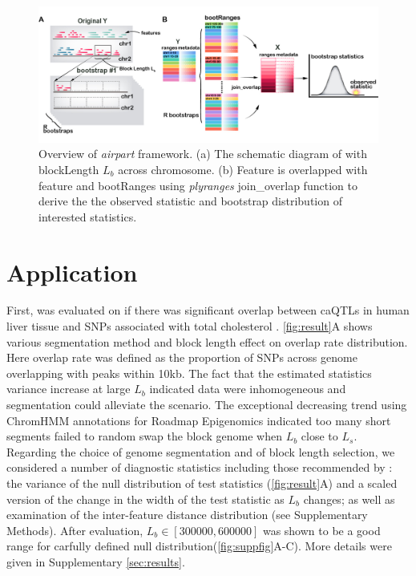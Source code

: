 \vspace{-0.3cm}
\begin{figure}[htbp]
\centering%
\setlength{\abovecaptionskip}{-0.05cm}
\includegraphics[scale=0.65]{Figures/bootRanges.jpg}
\caption{Overview of \textit{airpart} framework. (a) The schematic diagram of \bootranges with blockLength $L_b$ across chromosome. 
(b) 
Feature  is overlapped with feature  and bootRanges using \emph{plyranges} join\_overlap function
to derive 
the the observed statistic and bootstrap distribution of interested statistics.}
\label{fig:framework}
\vspace{-0.5cm}
\end{figure}

\vspace*{-20pt}
\section{Application}
First, \bootranges was evaluated on if there was significant overlap between caQTLs in human liver tissue and SNPs associated with total cholesterol \citep{CURRIN20211169}.
\cref{fig:result}A shows various segmentation method and block length effect on overlap rate distribution. Here overlap rate was defined as the proportion of SNPs across genome overlapping with peaks within 10kb. The fact that the estimated statistics variance increase at large $L_b$ indicated data were inhomogeneous and segmentation
could alleviate the scenario. The exceptional decreasing trend using ChromHMM annotations for Roadmap Epigenomics indicated too many short segments failed to random swap the block genome when $L_b$ close to $L_s$. 
Regarding the choice of genome segmentation and of block length selection, we considered a number of diagnostic statistics including those recommended by \citet{bickel2010subsampling}: the variance of the null distribution of test statistics (\cref{fig:result}A) and a scaled version of the change in the width of the test statistic as $L_b$ changes; as well as examination of the inter-feature distance distribution (see Supplementary Methods).
After evaluation, $L_b \in [300000,600000]$ was shown to be a good range for carfully defined null distribution(\cref{fig:suppfig}A-C). 
More details were given in Supplementary \cref{sec:results}.

